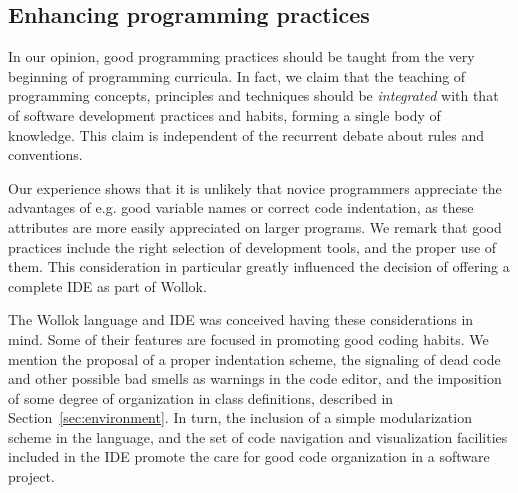 \subsection{Enhancing programming practices}
In our opinion, good programming practices should be taught from the very beginning of programming curricula.
In fact, we claim that the teaching of programming concepts, principles and techniques should be \emph{integrated} with that of software development practices and habits, forming a single body of knowledge.
This claim is independent of the recurrent debate about rules and conventions. 

Our experience shows that it is unlikely that novice programmers appreciate the advantages of e.g. good variable names or correct code indentation, as these attributes are more easily appreciated on larger programs.
We remark that good practices include the right selection of development tools, and the proper use of them. This consideration in particular greatly influenced the decision of offering a complete IDE as part of Wollok.

The Wollok language and IDE was conceived having these considerations in mind. Some of their features are focused in promoting good coding habits. We mention the proposal of a proper indentation scheme, the signaling of dead code and other possible bad smells as warnings in the code editor, and the imposition of some degree of organization in class definitions, described in Section~\ref{sec:environment}.
In turn, the inclusion of a simple modularization scheme in the language, and the set of code navigation and visualization facilities included in the IDE promote the care for good code organization in a software project.


